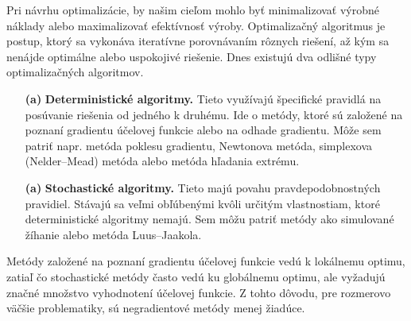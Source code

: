 Pri návrhu optimalizácie, 
by našim cieľom mohlo byť minimalizovať výrobné náklady alebo maximalizovať efektívnosť výroby. Optimalizačný algoritmus je postup, ktorý sa vykonáva iteratívne porovnávaním rôznych riešení, až kým sa nenájde optimálne alebo uspokojivé riešenie. Dnes existujú dva odlišné typy optimalizačných algoritmov.

\begin{itemize}
	\item[\textbf{(a)}] \textbf{Deterministické algoritmy.} 
	Tieto využívajú špecifické pravidlá na posúvanie riešenia 
	od jedného k druhému. Ide o metódy, ktoré sú založené na poznaní gradientu účelovej funkcie alebo na odhade gradientu. Môže sem patriť napr. metóda poklesu gradientu, Newtonova metóda, simplexova (Nelder--Mead) metóda alebo metóda hľadania extrému.
	\item[\textbf{(a)}] \textbf{Stochastické algoritmy.} 
	Tieto majú povahu pravdepodobnostných pravidiel.
	Stávajú sa veľmi obľúbenými kvôli určitým vlastnostiam, ktoré deterministické algoritmy nemajú. Sem môžu patriť metódy ako simulované žíhanie alebo metóda Luus--Jaakola.
\end{itemize}

Metódy založené na poznaní gradientu účelovej funkcie vedú k lokálnemu optimu, zatiaľ čo stochastické metódy často vedú ku globálnemu optimu, ale vyžadujú značné množstvo vyhodnotení účelovej funkcie. Z tohto dôvodu, pre rozmerovo väčšie problematiky, sú negradientové metódy menej žiadúce.
